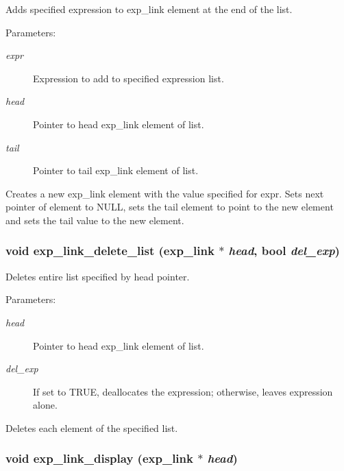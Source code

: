 Adds specified expression to exp\_\-link element at the end of the list.

\begin{Desc}
\item[Parameters: ]\par
\begin{description}
\item[{\em 
expr}]Expression to add to specified expression list. \item[{\em 
head}]Pointer to head exp\_\-link element of list. \item[{\em 
tail}]Pointer to tail exp\_\-link element of list.\end{description}
\end{Desc}
Creates a new exp\_\-link element with the value specified for expr. Sets next pointer of element to NULL, sets the tail element to point to the new element and sets the tail value to the new element. 
\subsubsection{\setlength{\rightskip}{0pt plus 5cm}void exp\_\-link\_\-delete\_\-list ({\bf exp\_\-link} $\ast$ {\em head}, {\bf bool} {\em del\_\-exp})}\label{link_8c_a19}


Deletes entire list specified by head pointer.

\begin{Desc}
\item[Parameters: ]\par
\begin{description}
\item[{\em 
head}]Pointer to head exp\_\-link element of list. \item[{\em 
del\_\-exp}]If set to TRUE, deallocates the expression; otherwise, leaves expression alone.\end{description}
\end{Desc}
Deletes each element of the specified list. 
\subsubsection{\setlength{\rightskip}{0pt plus 5cm}void exp\_\-link\_\-display ({\bf exp\_\-link} $\ast$ {\em head})}\label{link_8c_a8}


